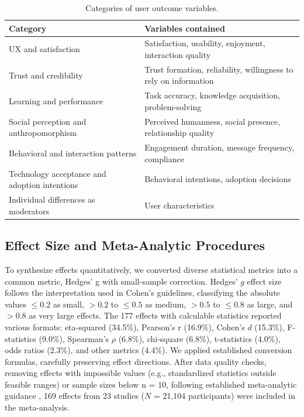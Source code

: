 \documentclass[lettersize,journal]{IEEEtran}
\begin{document}
\begin{table}[h]
\caption{Categories of user outcome variables.}
\label{tab:categories}
\footnotesize
\begin{tabular}{@{}p{}p{}@{}}
\toprule
\textbf{Category} & \textbf{Variables contained} \\
\midrule
UX and satisfaction & Satisfaction, usability, enjoyment, interaction quality \\
\addlinespace
Trust and credibility & Trust formation, reliability, willingness to rely on information \\
\addlinespace
Learning and performance & Task accuracy, knowledge acquisition, problem-solving \\
\addlinespace
Social perception and anthropomorphism & Perceived humanness, social presence, relationship quality \\
\addlinespace
Behavioral and interaction patterns & Engagement duration, message frequency, compliance \\
\addlinespace
Technology acceptance and adoption intentions & Behavioral intentions, adoption decisions \\
\addlinespace
Individual differences as moderators & User characteristics \\
\bottomrule
\end{tabular}
\end{table}



\subsection{Effect Size and Meta-Analytic Procedures}

To synthesize effects quantitatively, we converted diverse statistical metrics into a common metric, Hedges' g with small-sample correction. Hedges' $g$ effect size follows the interpretation used in Cohen's \cite{cohen2013statistical} guidelines, classifying the absolute values $\leq0.2$ as small, $>0.2$ to $\leq0.5$ as medium, $>0.5$ to $\leq0.8$ as large, and $>0.8$ as very large effects. The 177 effects with calculable statistics reported various formats: eta-squared (34.5\%), Pearson's r (16.9\%), Cohen's $d$ (15.3\%), F-statistics (9.0\%), Spearman's $\rho$ (6.8\%), chi-square (6.8\%), t-statistics (4.0\%), odds ratios (2.3\%), and other metrics (4.4\%). We applied established conversion formulas, carefully preserving effect directions. After data quality checks, removing effects with impossible values (e.g., standardized statistics outside feasible ranges) or sample sizes below n = 10, following established meta-analytic guidance \cite{borenstein2010basic}, 169 effects from 23 studies ($N$ = 21,104 participants) were included in the meta-analysis.
\end{document}
